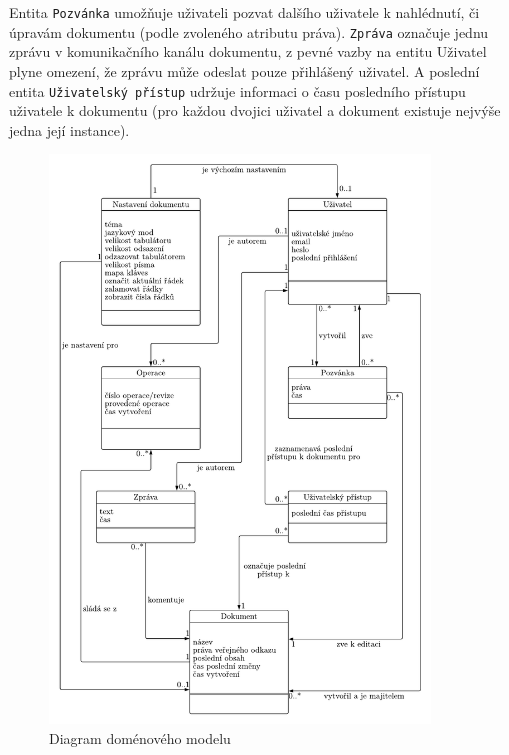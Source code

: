 Entita \texttt{Pozvánka} umožňuje uživateli pozvat dalšího uživatele k nahlédnutí, či úpravám dokumentu (podle zvoleného atributu práva).
\texttt{Zpráva} označuje jednu zprávu v komunikačního kanálu dokumentu, z pevné vazby na entitu Uživatel plyne omezení, že zprávu může odeslat pouze přihlášený uživatel.
A poslední entita \texttt{Uživatelský přístup} udržuje informaci o času posledního přístupu uživatele k dokumentu (pro každou dvojici uživatel a dokument existuje nejvýše jedna její instance).

\begin{figure}[ht!]
    \centering
    \includegraphics[width=0.9\textwidth]{partials/analyza/domenovy_model-2.pdf}
    \caption{Diagram doménového modelu}\label{fig:domenovy_model}
\end{figure}